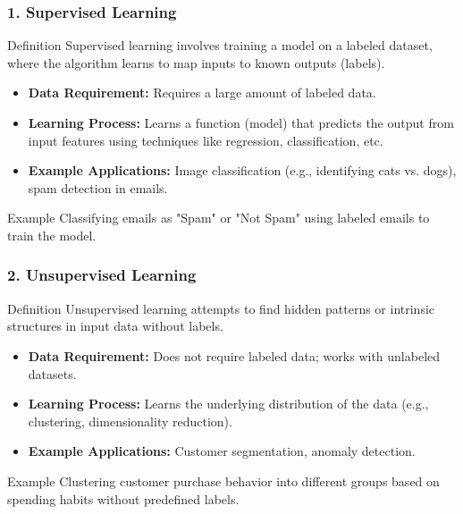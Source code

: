 \documentclass[aspectratio=169]{beamer}
\begin{document}
\begin{frame}[fragile]
    \frametitle{1. Supervised Learning}
    \begin{block}{Definition}
        Supervised learning involves training a model on a labeled dataset, where the algorithm learns to map inputs to known outputs (labels).
    \end{block}
    \begin{itemize}
        \item \textbf{Data Requirement:} Requires a large amount of labeled data.
        \item \textbf{Learning Process:} Learns a function (model) that predicts the output from input features using techniques like regression, classification, etc.
        \item \textbf{Example Applications:} Image classification (e.g., identifying cats vs. dogs), spam detection in emails.
    \end{itemize}
    \begin{block}{Example}
        Classifying emails as "Spam" or "Not Spam" using labeled emails to train the model.
    \end{block}
\end{frame}

\begin{frame}[fragile]
    \frametitle{2. Unsupervised Learning}
    \begin{block}{Definition}
        Unsupervised learning attempts to find hidden patterns or intrinsic structures in input data without labels.
    \end{block}
    \begin{itemize}
        \item \textbf{Data Requirement:} Does not require labeled data; works with unlabeled datasets.
        \item \textbf{Learning Process:} Learns the underlying distribution of the data (e.g., clustering, dimensionality reduction).
        \item \textbf{Example Applications:} Customer segmentation, anomaly detection.
    \end{itemize}
    \begin{block}{Example}
        Clustering customer purchase behavior into different groups based on spending habits without predefined labels.
    \end{block}
\end{frame}
\end{document}
